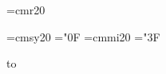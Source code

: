 \hsize=5in \hoffset=0.5in
\vsize=100in
\font\rm=cmr20
\nopagenumbers

\font\ms=cmsy20
\chardef\zeroeff="0F
\def\tbullet{{\ms\zeroeff}}
\font\mi=cmmi20
\chardef\threeeff="3F
\def\tstar{{\mi\threeeff}}

%
 to\type

\ifnum{}
\def\menuouter#1{
\setbox1=\hbox{#1}
\vbox{\hrule width\wd1 height\ht1 depth\dp1}
}
\else
\def\menuouter#1{
\setbox1=\hbox{#1}
\vbox{\hbox to\wd1{\copy1}}
}
\fi

\def\menuitem#1{\menuouter{\menuinner{#1}}}

%

\ifnum{}
\def\menuinner#1{\hbox{\hbox to0em{}\hbox to 1.2em{\hfill\tbullet\hfill}\phantom{#1}\hbox to0em{}}}
\else
\ifnum{}
\def\menuinner#1{\hbox{\hbox to0em{}\hbox to 1.2em{\hfill\tstar\hfill}\phantom{#1}\hbox to0em{}}}
\else
\def\menuinner#1{\hbox{\hbox to0em{}\hbox to 1.2em{\hfill}\hbox{#1}\hbox to0em{}}}
\fi
\fi

\def\titleline#1{\line{\hfill#1\hfill}}

\def\title#1{\vbox to0pt{\phantom{x}\vskip1in#1\vss}}

\def\menu#1{\vskip2.5in\line{\hfill \vbox{#1}\hfill}}

\rm
